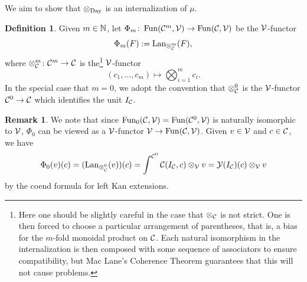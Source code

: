 \documentclass[openany, amssymb, psamsfonts]{amsart}
\theoremstyle{definition}
\newtheorem{defn}{Definition}[section]
\newtheorem{rem}{Remark}[section]
\numberwithin{equation}{section}
\begin{document}
We aim to show that $\otimes_{\mathrm{Day}}$ is an internalization of $\mu$.

\begin{defn}
Given $m \in \mathbb{N}$, let $\Phi_m \colon \operatorname{Fun}(\mathcal{C}^m, \mathcal{V}) \to \operatorname{Fun}(\mathcal{C}, \mathcal{V})$ be the $\mathcal{V}$-functor
\begin{equation*}
    \Phi_m(F) := \operatorname{Lan}_{\otimes_{\mathcal{C}}^m}(F),
\end{equation*} where $\otimes_{\mathcal{C}}^m \colon \mathcal{C}^m \to \mathcal{C}$ is the\footnote{Here one should be slightly careful in the case that $\otimes_{\mathcal{C}}$ is not strict. One is then forced to choose a particular arrangement of parentheses, that is, a bias for the $m$-fold monoidal product on $\mathcal{C}$. Each natural isomorphism in the internalization is then composed with some sequence of associators to ensure compatibility, but Mac Lane's Coherence Theorem guarantees that this will not cause problems.} $\mathcal{V}$-functor
\begin{equation*}
    (c_1, \dots, c_m) \mapsto \bigotimes_{i = 1}^m c_i.
\end{equation*} In the special case that $m = 0$, we adopt the convention that $\otimes_{\mathcal{C}}^0$ is the $\mathcal{V}$-functor $\mathcal{C}^0 \to \mathcal{C}$ which identifies the unit $I_{\mathcal{C}}$.
\end{defn}

\begin{rem} \label{rem:0_is_yoneda}
We note that since $\operatorname{Fun}_0(\mathcal{C}, \mathcal{V}) = \operatorname{Fun}(\mathcal{C}^0, \mathcal{V})$ is naturally isomorphic to $\mathcal{V}$, $\Phi_0$ can be viewed as a $\mathcal{V}$-functor $\mathcal{V} \to \operatorname{Fun}(\mathcal{C}, \mathcal{V})$. Given $v \in \mathcal{V}$ and $c \in \mathcal{C}$, we have
\begin{equation*}
    \Phi_0(v)(c) = (\operatorname{Lan}_{\otimes_{\mathcal{C}}^0}(v))(c) = \int^{\mathcal{C}^0} \mathcal{C}(I_{\mathcal{C}}, c) \otimes_{\mathcal{V}} v = \mathcal{Y}(I_{\mathcal{C}})(c) \otimes_{\mathcal{V}} v
\end{equation*} by the coend formula for left Kan extensions.
\end{rem}
\end{document}
